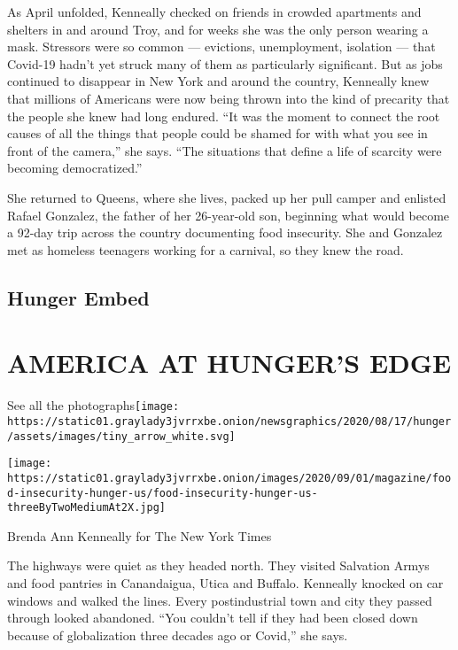 As April unfolded, Kenneally checked on friends in crowded apartments
and shelters in and around Troy, and for weeks she was the only person
wearing a mask. Stressors were so common --- evictions, unemployment,
isolation --- that Covid-19 hadn't yet struck many of them as
particularly significant. But as jobs continued to disappear in New York
and around the country, Kenneally knew that millions of Americans were
now being thrown into the kind of precarity that the people she knew had
long endured. ``It was the moment to connect the root causes of all the
things that people could be shamed for with what you see in front of the
camera,'' she says. ``The situations that define a life of scarcity were
becoming democratized.''

She returned to Queens, where she lives, packed up her pull camper and
enlisted Rafael Gonzalez, the father of her 26-year-old son, beginning
what would become a 92-day trip across the country documenting food
insecurity. She and Gonzalez met as homeless teenagers working for a
carnival, so they knew the road.

\hypertarget{hunger-embed}{%
\subsection{Hunger Embed}\label{hunger-embed}}

\href{https://www.nytimes3xbfgragh.onion/interactive/2020/09/02/magazine/food-insecurity-hunger-us.html}{}

\hypertarget{america-at-hungers-edge}{%
\section{AMERICA AT HUNGER'S EDGE}\label{america-at-hungers-edge}}

See all the
photographs\texttt{[image: https://static01.graylady3jvrrxbe.onion/newsgraphics/2020/08/17/hunger/assets/images/tiny\_arrow\_white.svg]}

\texttt{[image: https://static01.graylady3jvrrxbe.onion/images/2020/09/01/magazine/food-insecurity-hunger-us/food-insecurity-hunger-us-threeByTwoMediumAt2X.jpg]}

Brenda Ann Kenneally for The New York Times

The highways were quiet as they headed north. They visited Salvation
Armys and food pantries in Canandaigua, Utica and Buffalo. Kenneally
knocked on car windows and walked the lines. Every postindustrial town
and city they passed through looked abandoned. ``You couldn't tell if
they had been closed down because of globalization three decades ago or
Covid,'' she says.

